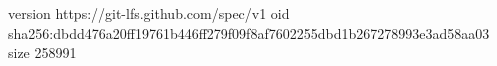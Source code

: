 version https://git-lfs.github.com/spec/v1
oid sha256:dbdd476a20ff19761b446ff279f09f8af7602255dbd1b267278993e3ad58aa03
size 258991

